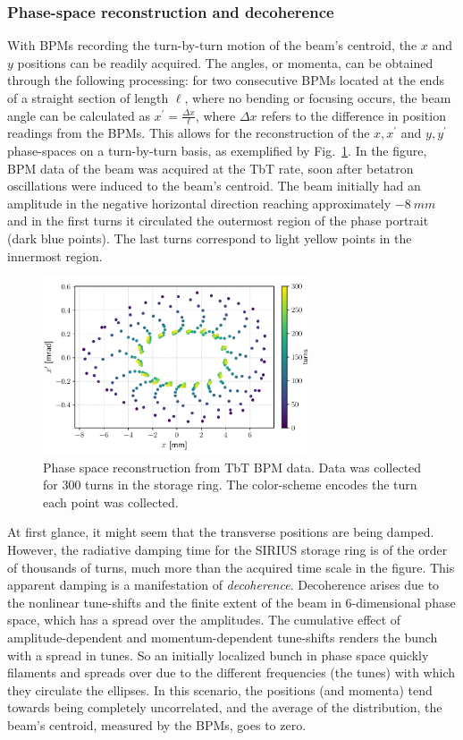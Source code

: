 \subsubsection{Phase-space reconstruction and decoherence}
With BPMs recording the turn-by-turn motion of the beam's centroid, the $x$ and $y$ positions can be readily acquired. The angles, or momenta, can be obtained through the following processing: for two consecutive BPMs located at the ends of a straight section of length $\ell$, where no bending or focusing occurs, the beam angle can be calculated as $x^\prime = \frac{\Delta x}{\ell}$, where $\Delta x$ refers to the difference in position readings from the BPMs. This allows for the reconstruction of the $x, x^\prime$ and $y, y^\prime$ phase-spaces on a turn-by-turn basis, as exemplified by Fig.~\ref{fig:phase_space_recons}. In the figure, BPM data of the beam was acquired at the TbT rate, soon after betatron oscillations were induced to the beam's centroid. The beam initially had an amplitude in the negative horizontal direction reaching approximately $-8~\unit{mm}$ and in the first turns it circulated the outermost region of the phase portrait (dark blue points). The last turns correspond to light yellow points in the innermost region.
\begin{figure}
    \centering
    \includegraphics[width=0.7\textwidth]{Images/phase_space_recons.pdf}
    \caption[Phase space reconstruction from TbT BPM data.]{Phase space reconstruction from TbT BPM data. Data was collected for 300 turns in the storage ring. The color-scheme encodes the turn each point was collected.}
    \label{fig:phase_space_recons}
\end{figure}

At first glance, it might seem that the transverse positions are being damped. However, the radiative damping time for the SIRIUS storage ring is of the order of thousands of turns, much more than the acquired time scale in the figure. This apparent damping is a manifestation of \textit{decoherence}. Decoherence arises due to the nonlinear tune-shifts and the finite extent of the beam in 6-dimensional phase space, which has a spread over the amplitudes. The cumulative effect of amplitude-dependent and momentum-dependent tune-shifts renders the bunch with a spread in tunes. So an initially localized bunch in phase space quickly filaments and spreads over due to the different frequencies (the tunes) with which they circulate the ellipses. In this scenario, the positions (and momenta) tend towards being completely uncorrelated, and the average of the distribution, the beam's centroid, measured by the BPMs, goes to zero.

